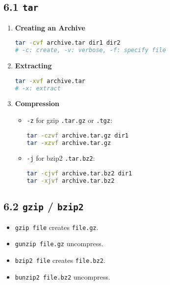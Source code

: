 \documentclass[a4paper]{report}
\begin{document}
\subsection*{6.1 \texttt{tar}}
\begin{enumerate}
    \item {\textbf{Creating an Archive}}
    \begin{lstlisting}[language=bash]
tar -cvf archive.tar dir1 dir2
# -c: create, -v: verbose, -f: specify file
    \end{lstlisting}
    \item {\textbf{Extracting}}
    \begin{lstlisting}[language=bash]
tar -xvf archive.tar
# -x: extract
    \end{lstlisting}

    \item{\textbf{Compression}}
    \begin{itemize}
        \item \texttt{-z} for gzip \textrightarrow \texttt{.tar.gz} or \texttt{.tgz}:
    \begin{lstlisting}[language=bash]
tar -czvf archive.tar.gz dir1
tar -xzvf archive.tar.gz
    \end{lstlisting}
        \item \texttt{-j} for bzip2 \textrightarrow \texttt{.tar.bz2}:
    \begin{lstlisting}[language=bash]
tar -cjvf archive.tar.bz2 dir1
tar -xjvf archive.tar.bz2
    \end{lstlisting}
    \end{itemize}

\end{enumerate}



\subsection*{6.2 \texttt{gzip} / \texttt{bzip2}}
\begin{itemize}
    \item \texttt{gzip file} \textrightarrow creates \texttt{file.gz}.
    \item \texttt{gunzip file.gz} \textrightarrow uncompress.
    \item \texttt{bzip2 file} \textrightarrow creates \texttt{file.bz2}.
    \item \texttt{bunzip2 file.bz2} \textrightarrow uncompress.
\end{itemize}
\end{document}
